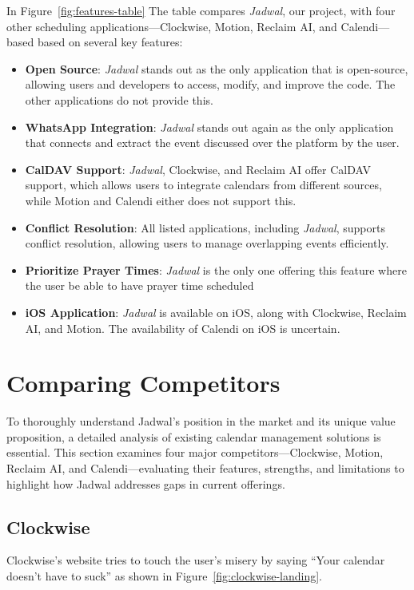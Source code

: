 \documentclass[12pt,a4paper]{report}
\begin{document}
In Figure~\ref{fig:features-table} The table compares \textit{Jadwal}, our project, with four other scheduling applications—Clockwise, Motion, Reclaim AI, and Calendi—based based on several key features:
\begin{itemize}
    \item \textbf{Open Source}: \textit{Jadwal} stands out as the only application that is open-source, allowing users and developers to access, modify, and improve the code. The other applications do not provide this.
    \item \textbf{WhatsApp Integration}: \textit{Jadwal} stands out again as the only application that connects and extract the event discussed over the platform by the user.
    \item \textbf{CalDAV Support}: \textit{Jadwal}, Clockwise, and Reclaim AI offer CalDAV support, which allows users to integrate calendars from different sources, while Motion and Calendi either does not support this.
    \item \textbf{Conflict Resolution}: All listed applications, including \textit{Jadwal}, supports conflict resolution, allowing users to manage overlapping events efficiently.
    \item \textbf{Prioritize Prayer Times}: \textit{Jadwal} is the only one offering this feature where the user be able to have prayer time scheduled
    \item \textbf{iOS Application}: \textit{Jadwal} is available on iOS, along with Clockwise, Reclaim AI, and Motion. The availability of Calendi on iOS is uncertain.
\end{itemize}

\section{Comparing Competitors}

To thoroughly understand Jadwal's position in the market and its unique value proposition, a detailed analysis of existing calendar management solutions is essential. This section examines four major competitors—Clockwise, Motion, Reclaim AI, and Calendi—evaluating their features, strengths, and limitations to highlight how Jadwal addresses gaps in current offerings.

\subsection{Clockwise}

Clockwise's website tries to touch the user's misery by saying ``Your calendar doesn't have to suck'' as shown in Figure~\ref{fig:clockwise-landing}.
\end{document}
